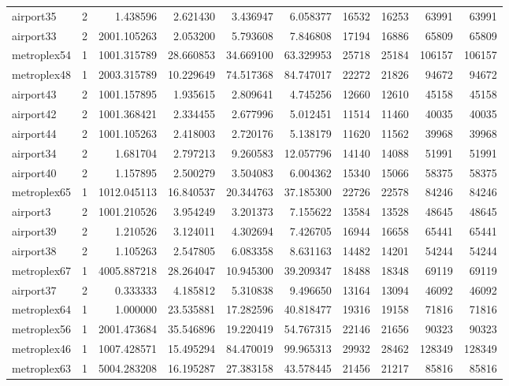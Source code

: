 \begin{longtable}{|l|r|r|r|r|r|r|r|r|r|}
airport35 & 2 & 1.438596 & 2.621430 & 3.436947 & 6.058377 & 16532 & 16253 & 63991 & 63991 \\
airport33 & 2 & 2001.105263 & 2.053200 & 5.793608 & 7.846808 & 17194 & 16886 & 65809 & 65809 \\
metroplex54 & 1 & 1001.315789 & 28.660853 & 34.669100 & 63.329953 & 25718 & 25184 & 106157 & 106157 \\
metroplex48 & 1 & 2003.315789 & 10.229649 & 74.517368 & 84.747017 & 22272 & 21826 & 94672 & 94672 \\
airport43 & 2 & 1001.157895 & 1.935615 & 2.809641 & 4.745256 & 12660 & 12610 & 45158 & 45158 \\
airport42 & 2 & 1001.368421 & 2.334455 & 2.677996 & 5.012451 & 11514 & 11460 & 40035 & 40035 \\
airport44 & 2 & 1001.105263 & 2.418003 & 2.720176 & 5.138179 & 11620 & 11562 & 39968 & 39968 \\
airport34 & 2 & 1.681704 & 2.797213 & 9.260583 & 12.057796 & 14140 & 14088 & 51991 & 51991 \\
airport40 & 2 & 1.157895 & 2.500279 & 3.504083 & 6.004362 & 15340 & 15066 & 58375 & 58375 \\
metroplex65 & 1 & 1012.045113 & 16.840537 & 20.344763 & 37.185300 & 22726 & 22578 & 84246 & 84246 \\
airport3 & 2 & 1001.210526 & 3.954249 & 3.201373 & 7.155622 & 13584 & 13528 & 48645 & 48645 \\
airport39 & 2 & 1.210526 & 3.124011 & 4.302694 & 7.426705 & 16944 & 16658 & 65441 & 65441 \\
airport38 & 2 & 1.105263 & 2.547805 & 6.083358 & 8.631163 & 14482 & 14201 & 54244 & 54244 \\
metroplex67 & 1 & 4005.887218 & 28.264047 & 10.945300 & 39.209347 & 18488 & 18348 & 69119 & 69119 \\
airport37 & 2 & 0.333333 & 4.185812 & 5.310838 & 9.496650 & 13164 & 13094 & 46092 & 46092 \\
metroplex64 & 1 & 1.000000 & 23.535881 & 17.282596 & 40.818477 & 19316 & 19158 & 71816 & 71816 \\
metroplex56 & 1 & 2001.473684 & 35.546896 & 19.220419 & 54.767315 & 22146 & 21656 & 90323 & 90323 \\
metroplex46 & 1 & 1007.428571 & 15.495294 & 84.470019 & 99.965313 & 29932 & 28462 & 128349 & 128349 \\
metroplex63 & 1 & 5004.283208 & 16.195287 & 27.383158 & 43.578445 & 21456 & 21217 & 85816 & 85816 \\

\end{longtable}
